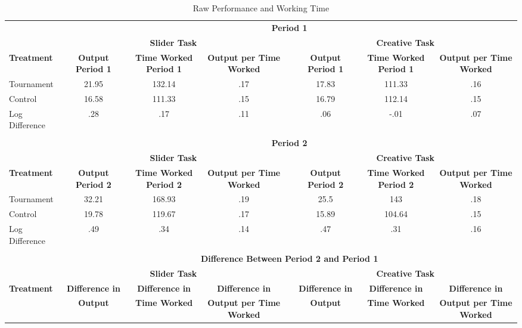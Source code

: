\begin{landscape}
\begin{table}[h]%
\setlength\tabcolsep{2pt}
\caption{Raw Performance and  Working Time}
\begin{center}%
{\small\renewcommand{\arraystretch}{1}%
\begin{tabular}{lccccccc}
\hline\hline\noalign{\smallskip}
 & \multicolumn{7}{c}{\bf Period 1} \\
& \multicolumn{3}{c}{\bf Slider Task} & & \multicolumn{3}{c}{\bf Creative Task} \\ \cline{2-4} \cline{6-8}
\bf Treatment & \bf Output Period 1 & \bf Time Worked Period 1 & \bf Output per Time Worked && \bf Output Period 1 & \bf Time Worked Period 1 & \bf Output per Time Worked \\
\hline
Tournament & 21.95 & 132.14 & .17 && 17.83 & 111.33 & .16 \\
Control & 16.58 & 111.33 & .15 && 16.79 & 112.14 & .15 \\
Log Difference & .28 & .17 & .11 && .06 & -.01 & .07 \\
 \\
 & \multicolumn{7}{c}{\bf Period 2} \\
& \multicolumn{3}{c}{\bf Slider Task} & & \multicolumn{3}{c}{\bf Creative Task} \\ \cline{2-4} \cline{6-8}
\bf Treatment & \bf Output Period 2 & \bf Time Worked Period 2 & \bf Output per Time Worked && \bf Output Period 2 & \bf Time Worked Period 2 & \bf Output per Time Worked \\
\hline
Tournament & 32.21 & 168.93 & .19 && 25.5 & 143 & .18 \\
Control & 19.78 & 119.67 & .17 && 15.89 & 104.64 & .15 \\
Log Difference & .49 & .34 & .14 && .47 & .31 & .16 \\
 \\
 & \multicolumn{7}{c}{\bf Difference Between Period 2 and Period 1} \\
& \multicolumn{3}{c}{\bf Slider Task} & & \multicolumn{3}{c}{\bf Creative Task} \\ \cline{2-4} \cline{6-8}
\bf Treatment & \bf Difference in & \bf Difference in & \bf Difference in              && \bf Difference in & \bf Difference in & \bf Difference in            \\
& \bf Output            & \bf Time Worked       & \bf Output per Time Worked && \bf Output              & \bf Time Worked       & \bf Output per Time Worked \\

\end{tabular}}
\end{center}
\end{table}
\end{landscape}
